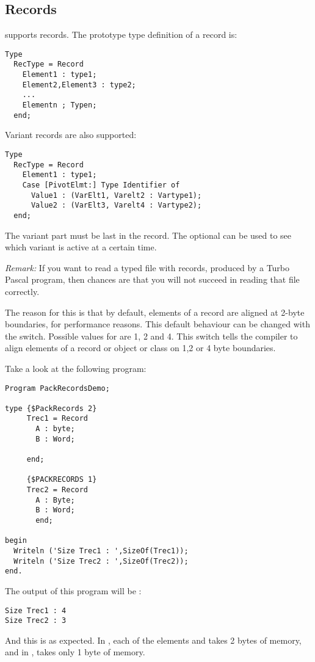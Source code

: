 \documentclass{report}
\begin{document}
\subsection{Records}

\fpc supports records. The prototype type definition of a record is:
\begin{verbatim}
Type
  RecType = Record
    Element1 : type1;
    Element2,Element3 : type2;
    ...
    Elementn ; Typen;
  end;
\end{verbatim}
Variant records are also supported:
\begin{verbatim}
Type
  RecType = Record
    Element1 : type1;
    Case [PivotElmt:] Type Identifier of
      Value1 : (VarElt1, Varelt2 : Vartype1);
      Value2 : (VarElt3, Varelt4 : Vartype2);
  end;
\end{verbatim}
The variant part must be last in the record. The optional 
can be used to see which variant is active at a certain time.

{\em Remark:} If you want to read a typed file with records, produced by
a Turbo Pascal program, then chances are that you will not succeed in
reading that file correctly. 

The reason for this is that by default, elements of a record are aligned at
2-byte boundaries, for performance reasons. This default behaviour can be
changed with the  switch. Possible values for
 are 1, 2 and 4. This switch tells the compiler to align elements of
a record or object or class on 1,2 or 4 byte boundaries. 

Take a look at the following program:
\begin{CodEx}
\begin{verbatim}
Program PackRecordsDemo;

type {$PackRecords 2}
     Trec1 = Record
       A : byte;
       B : Word;
       
     end;
     
     {$PACKRECORDS 1}
     Trec2 = Record
       A : Byte;
       B : Word;
       end;

begin
  Writeln ('Size Trec1 : ',SizeOf(Trec1));
  Writeln ('Size Trec2 : ',SizeOf(Trec2));
end.
\end{verbatim}
\end{CodEx}
The output of this program will be :
\begin{verbatim}
Size Trec1 : 4
Size Trec2 : 3
\end{verbatim}
And this is as expected. In , each of the elements  and
 takes 2 bytes of memory, and in  ,  takes only 1
byte of memory.
\end{document}
